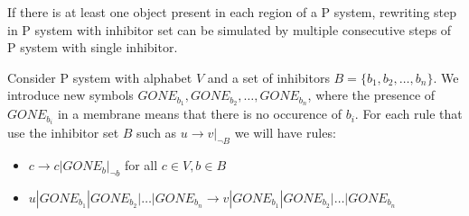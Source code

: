 \begin{lema}
\label{lemma:inhibitor_step}
  If there is at least one object present in each region of a P system, rewriting step in P system with inhibitor set can be simulated by multiple consecutive steps of P system with single inhibitor.
\end{lema}

\begin{dokaz}
  Consider P system with alphabet $V$ and a set of inhibitors $B=\{b_1, b_2, \dots ,b_n\}$.
  We introduce new symbols $GONE_{b_1}, GONE_{b_2}, \dots , GONE_{b_n}$, where the presence of $GONE_{b_i}$ in a membrane means that there is no occurence of $b_i$.
  For each rule that use the inhibitor set $B$ such as $u\rightarrow v|_{\neg B}$ we will have rules:
  \begin{itemize}
    \item $c \rightarrow c|GONE_{b}|_{\neg b}$ for all $ c\in V, b\in B$
    \item $u|GONE_{b_1}|GONE_{b_2}|\dots|GONE_{b_n} \rightarrow v|GONE_{b_1}|GONE_{b_2}|\dots|GONE_{b_n}$
  \end{itemize}
\end{dokaz}
